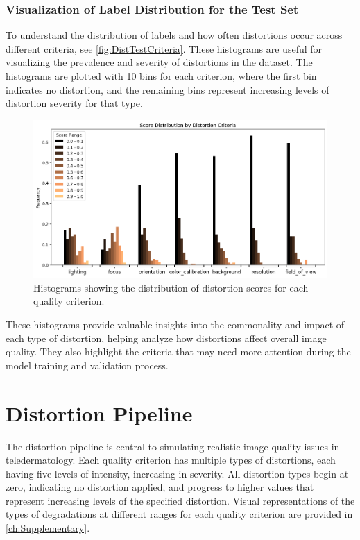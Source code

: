 \subsubsection{Visualization of Label Distribution for the Test Set}
\label{subsub:LabelDist}
To understand the distribution of labels and how often distortions occur across different criteria, see \autoref{fig:DistTestCriteria}. These histograms are useful for visualizing the prevalence and severity of distortions in the dataset. The histograms are plotted with 10 bins for each criterion, where the first bin indicates no distortion, and the remaining bins represent increasing levels of distortion severity for that type. \par
\begin{figure}[ht]
    \centering
    \includegraphics[keepaspectratio,width=15cm]{img/Distribution_test_criteria.png}
    \caption{Histograms showing the distribution of distortion scores for each quality criterion.}
    \label{fig:DistTestCriteria}
\end{figure}
\noindent
These histograms provide valuable insights into the commonality and impact of each type of distortion, helping analyze how distortions affect overall image quality. They also highlight the criteria that may need more attention during the model training and validation process. \par
\section{Distortion Pipeline}
\label{sec:DistPipeline}
The distortion pipeline is central to simulating realistic image quality issues in teledermatology. Each quality criterion has multiple types of distortions, each having five levels of intensity, increasing in severity. All distortion types begin at zero, indicating no distortion applied, and progress to higher values that represent increasing levels of the specified distortion. Visual representations of the types of degradations at different ranges for each quality criterion are provided in \autoref{ch:Supplementary}.  \par

